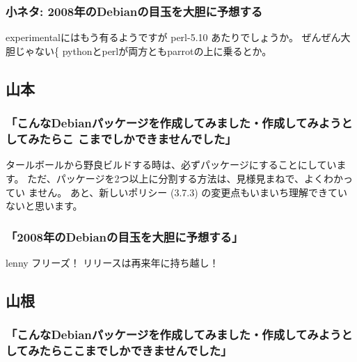 \documentclass[mingoth,a4paper]{jsarticle}
\begin{document}
\subsubsection{小ネタ: 2008年のDebianの目玉を大胆に予想する}

experimentalにはもう有るようですが perl-5.10 あたりでしょうか。
ぜんぜん大胆じゃない^^;
pythonとperlが両方ともparrotの上に乗るとか。


\subsection{山本}

\subsubsection{「こんなDebianパッケージを作成してみました・作成してみようとしてみたらこ
こまでしかできませんでした」}
タールボールから野良ビルドする時は、必ずパッケージにすることにしています。
ただ、パッケージを2つ以上に分割する方法は、見様見まねで、よくわかってい
ません。
あと、新しいポリシー (3.7.3) の変更点もいまいち理解できていないと思います。

\subsubsection{「2008年のDebianの目玉を大胆に予想する」}

lenny フリーズ！
リリースは再来年に持ち越し！


\subsection{山根}


\subsubsection{「こんなDebianパッケージを作成してみました・作成してみようとしてみたらここまでしかできませんでした」}
\end{document}
